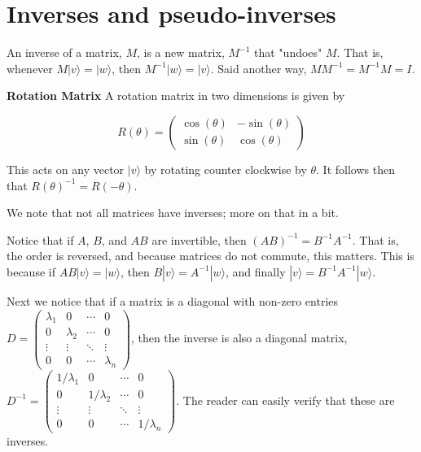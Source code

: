 \documentclass{amsbook}
\begin{document}
\section{Inverses and pseudo-inverses}

An inverse of a matrix, $M$, is a new matrix, $M^{-1}$ that "undoes" $M$.  That is, whenever $M|v\rangle=|w\rangle$, then $M^{-1}|w\rangle=|v\rangle$.  Said another way, $MM^{-1}=M^{-1}M=I$.

\begin{tcolorbox}[title=Example,colback=blue!5]
  {\bfseries\Large Rotation Matrix}
A rotation matrix in two dimensions is given by

$$
R(\theta)=\left(\begin{array}{cc}\cos(\theta) & -\sin(\theta) \\ \sin(\theta) & \cos(\theta)\end{array}\right)
$$

This acts on any vector $|v\rangle$ by rotating counter clockwise by $\theta$.  It follows then that $R(\theta)^{-1}=R(-\theta)$.
\end{tcolorbox}

We note that not all matrices have inverses; more on that in a bit.

Notice that if $A$, $B$, and $AB$ are invertible, then $(AB)^{-1}=B^{-1}A^{-1}$.  That is, the order is reversed, and because matrices do not commute, this matters.  This is because if $AB|v\rangle=|w\rangle$, then $B|v\rangle=A^{-1}|w\rangle$, and finally $|v\rangle=B^{-1}A^{-1}|w\rangle$.

Next we notice that if a matrix is a diagonal with non-zero entries $D=\left(\begin{array}{cccc}\lambda_1&0&\cdots&0\\0&\lambda_2&\cdots&0\\ \vdots&\vdots&\ddots&\vdots\\0&0&\cdots&\lambda_n\end{array}\right)$, then the inverse is also a diagonal matrix, $D^{-1}=\left(\begin{array}{cccc}1/\lambda_1&0&\cdots&0\\0&1/\lambda_2&\cdots&0\\ \vdots&\vdots&\ddots&\vdots\\0&0&\cdots&1/\lambda_n\end{array}\right)$.  The reader can easily verify that these are inverses.
\end{document}
